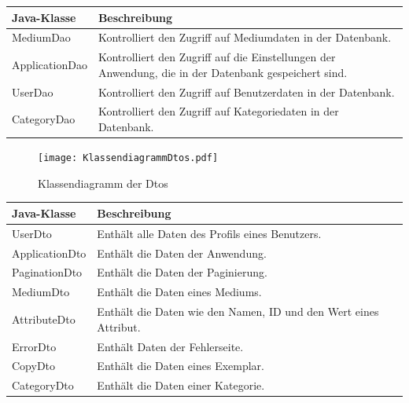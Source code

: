 \documentclass{article}
\begin{document}
\begin{center}
    \begin{table}
        \begin{tabular} { |p{}|p{}| }
            \hline
            Java-Klasse & Beschreibung \\
            \hline\hline
            MediumDao & Kontrolliert den Zugriff auf Mediumdaten in der Datenbank. \\
            \hline
            ApplicationDao & Kontrolliert den Zugriff auf die Einstellungen der Anwendung, die in der Datenbank gespeichert sind. \\
            \hline
            UserDao & Kontrolliert den Zugriff auf Benutzerdaten in der Datenbank. \\
            \hline
            CategoryDao & Kontrolliert den Zugriff auf Kategoriedaten in der Datenbank. \\
            \hline
        \end{tabular}
    \end{table}
\end{center}

\begin{center}
    \begin{figure}[H]
        \texttt{[image: KlassendiagrammDtos.pdf]}
        \caption{Klassendiagramm der Dtos  }
        \label{fig:Dtos- Klassendiagramm}
    \end{figure}
\end{center}

\begin{center}
    \begin{table}
        \begin{tabular} { |p{}|p{}| }
            \hline
            Java-Klasse & Beschreibung  \\
            \hline\hline
            UserDto & Enthält alle Daten des Profils eines Benutzers. \\
            \hline
            ApplicationDto & Enthält die Daten der Anwendung. \\
            \hline
            PaginationDto & Enthält die Daten der Paginierung. \\
            \hline
            MediumDto & Enthält die Daten eines Mediums. \\
            \hline
            AttributeDto & Enthält die Daten wie den Namen, ID und den Wert eines Attribut.\\
            \hline
            ErrorDto & Enthält Daten der Fehlerseite. \\
            \hline
            CopyDto & Enthält die   Daten eines Exemplar. \\
            \hline
            CategoryDto & Enthält die Daten einer Kategorie. \\
            \hline
        \end{tabular}
    \end{table}
\end{center}
\end{document}
